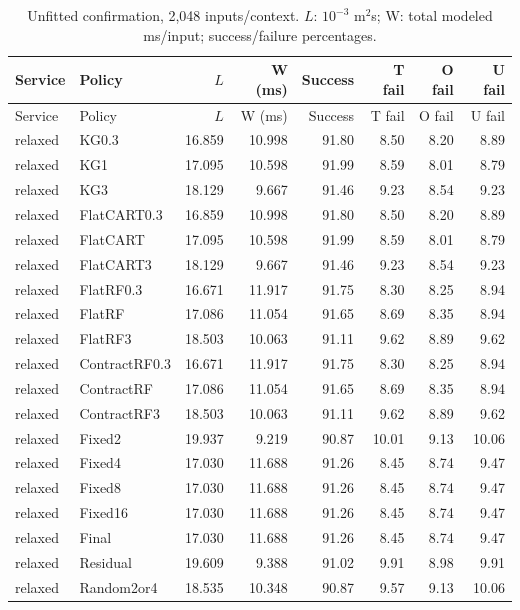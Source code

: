 \small\begin{longtable}{@{}llrrrrrr@{}}
\caption{Unfitted confirmation, 2,048 inputs/context. $L$: $10^{-3}$ m$^2$s; W: total modeled ms/input; success/failure percentages.}\label{supp:confirmation-unfitted}\\\toprule
Service & Policy & $L$ & W (ms) & Success & T fail & O fail & U fail\\\midrule\endfirsthead
\toprule
Service & Policy & $L$ & W (ms) & Success & T fail & O fail & U fail\\\midrule\endhead
relaxed & KG0.3 & 16.859 & 10.998 & 91.80 & 8.50 & 8.20 & 8.89\\
relaxed & KG1 & 17.095 & 10.598 & 91.99 & 8.59 & 8.01 & 8.79\\
relaxed & KG3 & 18.129 & 9.667 & 91.46 & 9.23 & 8.54 & 9.23\\
relaxed & FlatCART0.3 & 16.859 & 10.998 & 91.80 & 8.50 & 8.20 & 8.89\\
relaxed & FlatCART & 17.095 & 10.598 & 91.99 & 8.59 & 8.01 & 8.79\\
relaxed & FlatCART3 & 18.129 & 9.667 & 91.46 & 9.23 & 8.54 & 9.23\\
relaxed & FlatRF0.3 & 16.671 & 11.917 & 91.75 & 8.30 & 8.25 & 8.94\\
relaxed & FlatRF & 17.086 & 11.054 & 91.65 & 8.69 & 8.35 & 8.94\\
relaxed & FlatRF3 & 18.503 & 10.063 & 91.11 & 9.62 & 8.89 & 9.62\\
relaxed & ContractRF0.3 & 16.671 & 11.917 & 91.75 & 8.30 & 8.25 & 8.94\\
relaxed & ContractRF & 17.086 & 11.054 & 91.65 & 8.69 & 8.35 & 8.94\\
relaxed & ContractRF3 & 18.503 & 10.063 & 91.11 & 9.62 & 8.89 & 9.62\\
relaxed & Fixed2 & 19.937 & 9.219 & 90.87 & 10.01 & 9.13 & 10.06\\
relaxed & Fixed4 & 17.030 & 11.688 & 91.26 & 8.45 & 8.74 & 9.47\\
relaxed & Fixed8 & 17.030 & 11.688 & 91.26 & 8.45 & 8.74 & 9.47\\
relaxed & Fixed16 & 17.030 & 11.688 & 91.26 & 8.45 & 8.74 & 9.47\\
relaxed & Final & 17.030 & 11.688 & 91.26 & 8.45 & 8.74 & 9.47\\
relaxed & Residual & 19.609 & 9.388 & 91.02 & 9.91 & 8.98 & 9.91\\
relaxed & Random2or4 & 18.535 & 10.348 & 90.87 & 9.57 & 9.13 & 10.06\\

\end{longtable}
